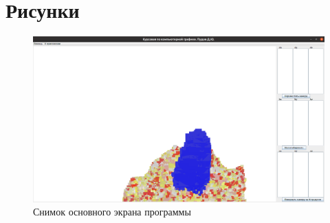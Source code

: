 \chapter{Рисунки}
\label{cha:appendix1}

\begin{figure}
    \includegraphics[width=0.9\linewidth]{img/screen.png}
    \caption{Снимок основного экрана программы}
    \label{screen:main}
\end{figure}

